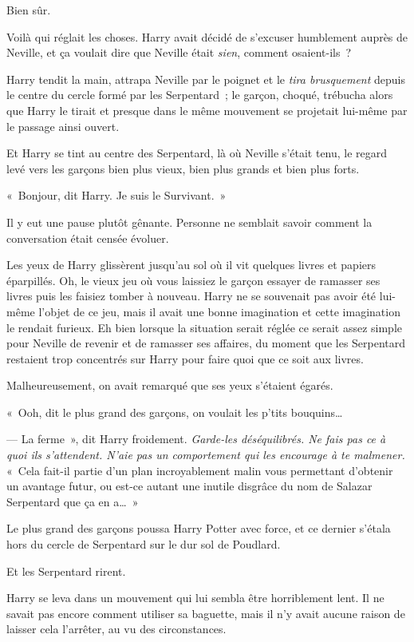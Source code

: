 Bien sûr.

Voilà qui réglait les choses. Harry avait décidé de s'excuser humblement auprès de Neville, et ça voulait dire que Neville était \emph{sien}, comment osaient-ils~?

Harry tendit la main, attrapa Neville par le poignet et le \emph{tira brusquement} depuis le centre du cercle formé par les Serpentard~; le garçon, choqué, trébucha alors que Harry le tirait et presque dans le même mouvement se projetait lui-même par le passage ainsi ouvert.

Et Harry se tint au centre des Serpentard, là où Neville s'était tenu, le regard levé vers les garçons bien plus vieux, bien plus grands et bien plus forts.

«~Bonjour, dit Harry. Je suis le Survivant.~»

Il y eut une pause plutôt gênante. Personne ne semblait savoir comment la conversation était censée évoluer.

Les yeux de Harry glissèrent jusqu'au sol où il vit quelques livres et papiers éparpillés. Oh, le vieux jeu où vous laissiez le garçon essayer de ramasser ses livres puis les faisiez tomber à nouveau. Harry ne se souvenait pas avoir été lui-même l'objet de ce jeu, mais il avait une bonne imagination et cette imagination le rendait furieux. Eh bien lorsque la situation serait réglée ce serait assez simple pour Neville de revenir et de ramasser ses affaires, du moment que les Serpentard restaient trop concentrés sur Harry pour faire quoi que ce soit aux livres.

Malheureusement, on avait remarqué que ses yeux s'étaient égarés.

«~Ooh, dit le plus grand des garçons, on voulait les p'tits bouquins…

--- La ferme~», dit Harry froidement. \emph{Garde-les déséquilibrés. Ne fais pas ce à quoi ils s'attendent. N'aie pas un comportement qui les encourage à te malmener.} «~Cela fait-il partie d'un plan incroyablement malin vous permettant d'obtenir un avantage futur, ou est-ce autant une inutile disgrâce du nom de Salazar Serpentard que ça en a…~»

Le plus grand des garçons poussa Harry Potter avec force, et ce dernier s'étala hors du cercle de Serpentard sur le dur sol de Poudlard.

Et les Serpentard rirent.

Harry se leva dans un mouvement qui lui sembla être horriblement lent. Il ne savait pas encore comment utiliser sa baguette, mais il n'y avait aucune raison de laisser cela l'arrêter, au vu des circonstances.

